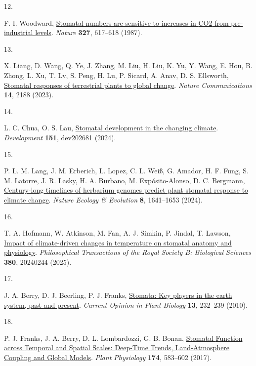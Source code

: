 \documentclass[
  letterpaper,
  DIV=11,
  numbers=noendperiod]{scrartcl}
\newlength{\cslhangindent}
\newlength{\csllabelwidth}
\newenvironment{CSLReferences}[2] %
 {\begin{list}{}{%
  \setlength{\itemindent}{0pt}
  \setlength{\leftmargin}{0pt}
  \setlength{\parsep}{0pt}
  \ifodd #1
   \setlength{\leftmargin}{\cslhangindent}
   \setlength{\itemindent}{-1\cslhangindent}
  \fi
  \setlength{\itemsep}{#2\baselineskip}}}
 {\end{list}}
\newcommand{\CSLLeftMargin}[1]{\parbox[t]{\csllabelwidth}{\strut#1\strut}}
\newcommand{\CSLRightInline}[1]{\parbox[t]{\linewidth - \csllabelwidth}{\strut#1\strut}}
\begin{document}
\begin{CSLReferences}{0}{1}
\CSLLeftMargin{12. }%
\CSLRightInline{F. I. Woodward,
\href{https://doi.org/10.1038/327617a0}{Stomatal numbers are sensitive
to increases in {CO2} from pre-industrial levels}. \emph{Nature}
\textbf{327}, 617--618 (1987).}

\CSLLeftMargin{13. }%
\CSLRightInline{X. Liang, D. Wang, Q. Ye, J. Zhang, M. Liu, H. Liu, K.
Yu, Y. Wang, E. Hou, B. Zhong, L. Xu, T. Lv, S. Peng, H. Lu, P. Sicard,
A. Anav, D. S. Ellsworth,
\href{https://doi.org/10.1038/s41467-023-37934-7}{Stomatal responses of
terrestrial plants to global change}. \emph{Nature Communications}
\textbf{14}, 2188 (2023).}

\CSLLeftMargin{14. }%
\CSLRightInline{L. C. Chua, O. S. Lau,
\href{https://doi.org/10.1242/dev.202681}{Stomatal development in the
changing climate}. \emph{Development} \textbf{151}, dev202681 (2024).}

\CSLLeftMargin{15. }%
\CSLRightInline{P. L. M. Lang, J. M. Erberich, L. Lopez, C. L. Weiß, G.
Amador, H. F. Fung, S. M. Latorre, J. R. Lasky, H. A. Burbano, M.
Expósito-Alonso, D. C. Bergmann,
\href{https://doi.org/10.1038/s41559-024-02481-x}{Century-long timelines
of herbarium genomes predict plant stomatal response to climate change}.
\emph{Nature Ecology \& Evolution} \textbf{8}, 1641--1653 (2024).}

\CSLLeftMargin{16. }%
\CSLRightInline{T. A. Hofmann, W. Atkinson, M. Fan, A. J. Simkin, P.
Jindal, T. Lawson, \href{https://doi.org/10.1098/rstb.2024.0244}{Impact
of climate-driven changes in temperature on stomatal anatomy and
physiology}. \emph{Philosophical Transactions of the Royal Society B:
Biological Sciences} \textbf{380}, 20240244 (2025).}

\CSLLeftMargin{17. }%
\CSLRightInline{J. A. Berry, D. J. Beerling, P. J. Franks,
\href{https://doi.org/10.1016/j.pbi.2010.04.013}{Stomata: Key players in
the earth system, past and present}. \emph{Current Opinion in Plant
Biology} \textbf{13}, 232--239 (2010).}

\CSLLeftMargin{18. }%
\CSLRightInline{P. J. Franks, J. A. Berry, D. L. Lombardozzi, G. B.
Bonan, \href{https://doi.org/10.1104/pp.17.00287}{Stomatal {Function}
across {Temporal} and {Spatial} {Scales}: {Deep}-{Time} {Trends},
{Land}-{Atmosphere} {Coupling} and {Global} {Models}}. \emph{Plant
Physiology} \textbf{174}, 583--602 (2017).}


\end{CSLReferences}
\end{document}
